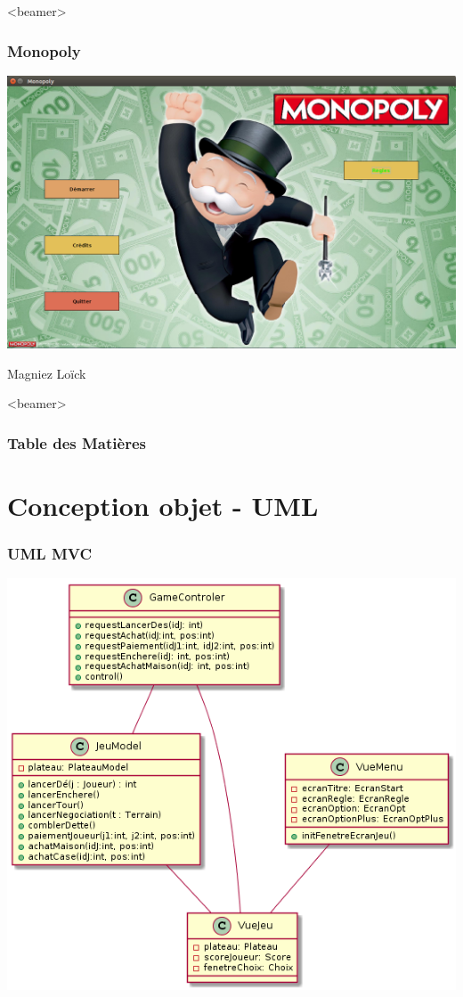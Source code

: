\documentclass{beamer}
\begin{document}
  
 \begin{darkframes}
    \begin{frame}<beamer>
     \frametitle[alignment=center]{Monopoly}
      \begin{center}
		\includegraphics[scale=0.25]{./img/titre.png}
		
		\end{center}
		\vspace*{0.1cm}
		  \begin{center}
		Magniez Loïck
		\end{center}
    \end{frame}

    \begin{frame}<beamer>
      \frametitle{Table des Matières}
      \tableofcontents[]
    \end{frame}
    

 \section{Conception objet - UML}
 \begin{frame}
 	 \frametitle{UML MVC}
 	 \includegraphics[scale=0.3]{./img/umlMVC.png}
 \end{frame}
 

\end{darkframes}
\end{document}
